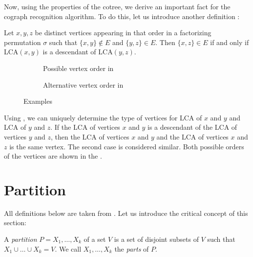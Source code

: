 Now, using the properties of the cotree, we derive an important fact for the cograph recognition algorithm. To do this, let us introduce another definition :

\begin{remark}
    Let $x, y, z$ be distinct vertices appearing in that order in a factorizing permutation $\sigma$ such that $\{x,y\} \notin E$ and $\{y,z\} \in E$. Then $\{x,z\} \in E $ if and only if LCA$(x,y)$ is a descendant of LCA$(y,z)$.
    \label{Corollary 11}
\end{remark}

\begin{figure}
\centering
     \begin{subfigure}[b]{0.44\textwidth}
    \centering
    
    \caption{Possible vertex order in }
    \label{fig:Possible vertex orders in Remark 3}
    \end{subfigure}
    \qquad
    \begin{subfigure}[b]{0.49\textwidth}
    \centering
    
    \caption{Alternative vertex order in }
    \label{fig:Alternating vertex order in Remark 3}
    \end{subfigure}
    
    \label{fig:vertex orderings}
    \caption{Examples}
\end{figure}

Using , we can uniquely determine the type of vertices for LCA of $x$ and $y$ and LCA of $y$ and $z$. If the LCA of vertices $x$ and $y$ is a descendant of the LCA of vertices $y$ and $z$, then the LCA of vertices $x$ and $y$ and the LCA of vertices $x$ and $z$ is the same vertex. The second case is considered similar. Both possible orders of the vertices are shown in the .

\section{Partition}
All definitions below are taken from \cite{HABIB2005183}.
Let us introduce the critical concept of this section:
\begin{definition}[Partition]
  A \emph{partition} $P={X_1,\dots, X_k}$ of a set $V$ is a set of disjoint subsets of $V$ such that $X_1 \cup \dots \cup X_k=V$. We call ${X_1,\dots, X_k}$ the \emph{parts} of $P$.
\end{definition}

